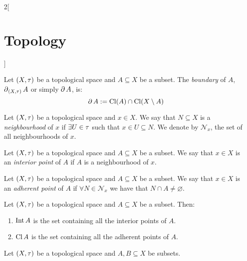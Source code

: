 \documentclass[../../../main.tex]{subfiles}
\begin{document}
\begin{multicols}{2}[\section{Topology}]
\begin{prop}
  \end{prop}
  \begin{definition}
    Let $(X,\tau)$ be a topological space and $A\subseteq X$ be a subset. The \textit{boundary} of $A$, $\operatorname{\partial}_{(X,\tau)}A$ or simply $\operatorname{\partial} A$, is: $$\operatorname{\partial} A:=\operatorname{Cl}(A)\cap\operatorname{Cl}(X\setminus A)$$
  \end{definition}
  \begin{definition}
    Let $(X,\tau)$ be a topological space and $x\in X$. We say that $N\subseteq X$ is a \textit{neighbourhood} of $x$ if $\exists U\in\tau$ such that $x\in U\subseteq N$. We denote by $\mathcal{N}_x$, the set of all neighbourhoods of $x$.
  \end{definition}
  \begin{definition}
    Let $(X,\tau)$ be a topological space and $A\subseteq X$ be a subset. We say that $x\in X$ is an \textit{interior point} of $A$ if $A$ is a neighbourhood of $x$.
  \end{definition}
  \begin{definition}
    Let $(X,\tau)$ be a topological space and $A\subseteq X$ be a subset. We say that $x\in X$ is an \textit{adherent point} of $A$ if $\forall N\in\mathcal{N}_x$ we have that $N\cap A\ne\varnothing$.
  \end{definition}
  \begin{prop}
    Let $(X,\tau)$ be a topological space and $A\subseteq X$ be a subset. Then:
    \begin{enumerate}
      \item $\operatorname{Int} A$ is the set containing all the interior points of $A$.
      \item $\operatorname{Cl} A$ is the set containing all the adherent points of $A$.
    \end{enumerate}
  \end{prop}
  \begin{prop}
    Let $(X,\tau)$ be a topological space and $A,B\subseteq X$ be subsets.


\end{prop}
\end{multicols}
\end{document}
